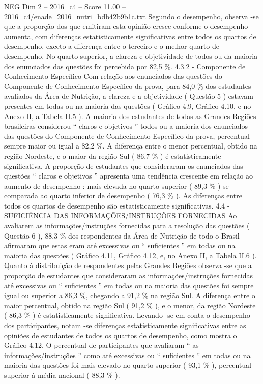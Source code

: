 \begin{textsample}{NEG Dim 2 – 2016\_c4 – Score 11.00 – 2016\_c4/enade\_2016\_nutri\_bdb42b9b1c.txt}
Segundo o desempenho, observa -se que a proporção dos que emitiram esta opinião cresce conforme o desempenho aumenta, com diferenças estatisticamente significativas entre todos os quartos de desempenho, exceto a diferença entre o terceiro e o melhor quarto de desempenho.
No quarto superior, a clareza e objetividade de todos ou da maioria dos enunciados das questões foi percebida por 82,5 \%. 4.3.2 - Componente de Conhecimento Específico Com relação aos enunciados das questões do Componente de Conhecimento Específico da prova, para 84,0 \% dos estudantes avaliados da Área de Nutrição, a clareza e a objetividade ( Questão 5 ) estavam presentes em todas ou na maioria das questões ( Gráfico 4.9, Gráfico 4.10, e no Anexo II, a Tabela II.5 ).
A maioria dos estudantes de todas as Grandes Regiões brasileiras considerou “ claros e objetivos ” todos ou a maioria dos enunciados das questões do Componente de Conhecimento Específico da prova, percentual sempre maior ou igual a 82,2 \%.
A diferença entre o menor percentual, obtido na região Nordeste, e o maior da região Sul ( 86,7 \% ) é estatisticamente significativa.
A proporção de estudantes que consideraram os enunciados das questões “ claros e objetivos ” apresenta uma tendência crescente em relação ao aumento de desempenho : mais elevada no quarto superior ( 89,3 \% ) se comparada ao quarto inferior de desempenho ( 76,3 \% ).
As diferenças entre todos os quartos de desempenho são estatisticamente significativas. 4.4 - SUFICIÊNCIA DAS INFORMAÇÕES/INSTRUÇÕES FORNECIDAS Ao avaliarem as informações/instruções fornecidas para a resolução das questões ( Questão 6 ), 88,3 \% dos respondentes da Área de Nutrição de todo o Brasil afirmaram que estas eram até excessivas ou “ suficientes ” em todas ou na maioria das questões ( Gráfico 4.11, Gráfico 4.12, e, no Anexo II, a Tabela II.6 ).
Quanto à distribuição de respondentes pelas Grandes Regiões observa -se que a proporção de estudantes que consideraram as informações/instruções fornecidas até excessivas ou “ suficientes ” em todas ou na maioria das questões foi sempre igual ou superior a 86,3 \%, chegando a 91,2 \% na região Sul.
A diferença entre o maior percentual, obtido na região Sul ( 91,2 \% ), e o menor, da região Nordeste ( 86,3 \% ) é estatisticamente significativa.
Levando -se em conta o desempenho dos participantes, notam -se diferenças estatisticamente significativas entre as opiniões de estudantes de todos os quartos de desempenho, como mostra o Gráfico 4.12.
O percentual de participantes que avaliaram “ as informações/instruções ” como até excessivas ou “ suficientes ” em todas ou na maioria das questões foi mais elevado no quarto superior ( 93,1 \% ), percentual superior à média nacional ( 88,3 \% ).

\end{textsample}
